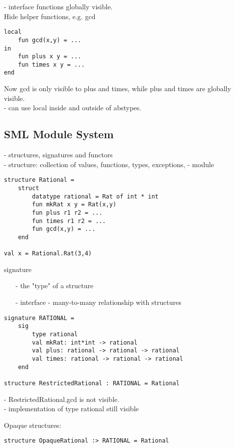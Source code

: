 \documentclass[11pt]{article}
\begin{document}
- interface functions globally visible. \\

Hide helper functions, e.g. gcd
\begin{verbatim}
local
	fun gcd(x,y) = ...
in 
	fun plus x y = ...
	fun times x y = ...
end
\end{verbatim}

Now gcd is only visible to plus and times, while plus and times are globally visible. \\

- can use local inside and outside of abstypes. \\

\subsection{SML Module System}

- structures, signatures and functors \\

- structure: collection of values, functions, types, exceptions, - module \\

\begin{verbatim}
structure Rational =
	struct
		datatype rational = Rat of int * int
		fun mkRat x y = Rat(x,y)
		fun plus r1 r2 = ...
		fun times r1 r2 = ...
		fun gcd(x,y) = ...
	end

val x = Rational.Rat(3,4)
\end{verbatim}

signature 
\begin{itemize}
	\item[-] the "type" of a structure
	\item[-] interface - many-to-many relationship with structures
\end{itemize}

\begin{verbatim}
signature RATIONAL = 
	sig
		type rational
		val mkRat: int*int -> rational
		val plus: rational -> rational -> rational
		val times: rational -> rational -> rational
	end
	
structure RestrictedRational : RATIONAL = Rational
\end{verbatim}

- RestrictedRational.gcd is not visible. \\

- implementation of type rational still visible

Opaque structures: 
\begin{verbatim}
structure OpaqueRational :> RATIONAL = Rational
\end{verbatim}
\end{document}
